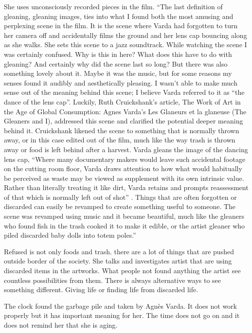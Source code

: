 \documentclass[12pt]{article}
\providecommand{\quotes}[1]{``#1''}
\begin{document}
She uses unconsciously recorded pieces in the film. \quotes{The last definition of gleaning, gleaning images, ties into what I found both the most amusing and perplexing scene in the film. It is the scene where Varda had forgotten to turn her camera off and accidentally films the ground and her lens cap bouncing along as she walks. She sets this scene to a jazz soundtrack. While watching the scene I was certainly confused. Why is this in here? What does this have to do with gleaning? And certainly why did the scene last so long? But there was also something lovely about it. Maybe it was the music, but for some reasons my senses found it audibly and aesthetically pleasing. I wasn’t able to make much sense out of the meaning behind this scene; I believe Varda referred to it as \quotes{the dance of the lens cap}.  Luckily, Ruth Cruickshank’s article, The Work of Art in the Age of Global Consumption: Agnes Varda’s Les Glaneurs et la glaneuse (The Gleaners and I), addressed this scene and clarified the potential deeper meaning behind it. Cruickshank likened the scene to something that is normally thrown away, or in this case edited out of the film, much like the way trash is thrown away or food is left behind after a harvest. Varda gleans the image of the dancing lens cap, \quotes{Where many documentary makers would leave such accidental footage on the cutting room floor, Varda draws attention to how what would habitually be perceived as waste may be viewed as supplement with its own intrinsic value. Rather than literally treating it like dirt, Varda retains and prompts reassessment of that which is normally left out of shot} \cite{cruickshank2007work}. Things that are often forgotten or discarded can easily be revamped to create something useful to someone. The scene was revamped using music and it became beautiful, much like the gleaners who found fish in the trash cooked it to make it edible, or the artist gleaner who piled discarded baby dolls into totem poles.} 

Refused is not only foods and trash. there are a lot of things that are pushed outside border of the society. She talks and investigates artist that are using discarded items in the artworks. What people not found anything the artist see countless possibilities from them. There is always alternative ways to see something different. Giving life or finding life from discarded life.

The clock found the garbage pile and taken by Agnès Varda. It does not work properly but it has important meaning for her. The time does not go on and it does not remind her that she is aging.
\end{document}
